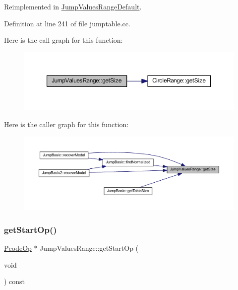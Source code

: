 Reimplemented in \mbox{\hyperlink{class_jump_values_range_default_a079bd26853aa52ccac577fd39c1a3e3e}{Jump\+Values\+Range\+Default}}.



Definition at line 241 of file jumptable.\+cc.

Here is the call graph for this function\+:
\nopagebreak
\begin{figure}[H]
\begin{center}
\leavevmode
\includegraphics[width=350pt]{class_jump_values_range_aabad0182df2b5178abcb597278a4ec20_cgraph}
\end{center}
\end{figure}
Here is the caller graph for this function\+:
\nopagebreak
\begin{figure}[H]
\begin{center}
\leavevmode
\includegraphics[width=350pt]{class_jump_values_range_aabad0182df2b5178abcb597278a4ec20_icgraph}
\end{center}
\end{figure}
\mbox{\label{class_jump_values_range_a22ef1c5380849124e596224bac24413e}} 
\subsubsection{\texorpdfstring{getStartOp()}{getStartOp()}}
{\footnotesize\ttfamily \mbox{\hyperlink{class_pcode_op}{Pcode\+Op}} $\ast$ Jump\+Values\+Range\+::get\+Start\+Op (\begin{DoxyParamCaption}\item[{void}]{ }\end{DoxyParamCaption}) const\hspace{0.3cm}{\ttfamily [virtual]}}



